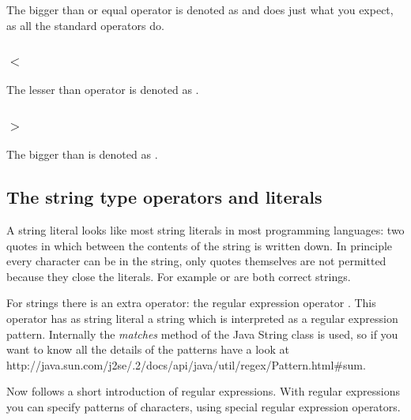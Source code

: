 The bigger than or equal operator is denoted as \ltl{$>=$} and does just what you
expect, as all the standard operators do.

\subsubsection{$<$}

The lesser than operator is denoted as \ltl{$<$}.

\subsubsection{$>$}

The bigger than is denoted as \ltl{$>$}.

\subsection{The string type operators and literals}

A string literal looks like most string literals in most programming
languages: two quotes in which between the contents of the string is written
down. In principle every character can be in the string, only quotes
themselves are not permitted because they close the literals. For example
 or  are both
correct strings. 

For strings there is an extra operator: the regular expression operator
\label{language:regexp}
\ltl{\~{}=}. This operator has as string literal a string which is interpreted
as a regular expression pattern. Internally the \textit{matches} method of the
Java String class is used, so if you want to know all the details of the
patterns have a look at
http://\-java.sun.com/\-j2se/.2/\-docs/\-api/\-java/\-util/\-regex/\-Pattern.html\#sum.

Now follows a short introduction of regular expressions. With regular
expressions you can specify patterns of characters, using special regular
expression operators. 

